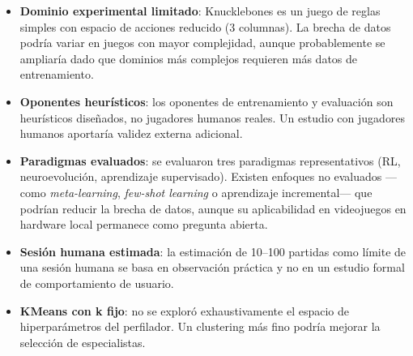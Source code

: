 \begin{itemize}
    \item \textbf{Dominio experimental limitado}: Knucklebones es un juego de reglas simples con espacio de acciones reducido (3 columnas). La brecha de datos podría variar en juegos con mayor complejidad, aunque probablemente se ampliaría dado que dominios más complejos requieren más datos de entrenamiento.
    \item \textbf{Oponentes heurísticos}: los oponentes de entrenamiento y evaluación son heurísticos diseñados, no jugadores humanos reales. Un estudio con jugadores humanos aportaría validez externa adicional.
    \item \textbf{Paradigmas evaluados}: se evaluaron tres paradigmas representativos (RL, neuroevolución, aprendizaje supervisado). Existen enfoques no evaluados ---como \textit{meta-learning}, \textit{few-shot learning} o aprendizaje incremental--- que podrían reducir la brecha de datos, aunque su aplicabilidad en videojuegos en hardware local permanece como pregunta abierta.
    \item \textbf{Sesión humana estimada}: la estimación de 10--100 partidas como límite de una sesión humana se basa en observación práctica y no en un estudio formal de comportamiento de usuario.
    \item \textbf{KMeans con k fijo}: no se exploró exhaustivamente el espacio de hiperparámetros del perfilador. Un clustering más fino podría mejorar la selección de especialistas.
\end{itemize}

